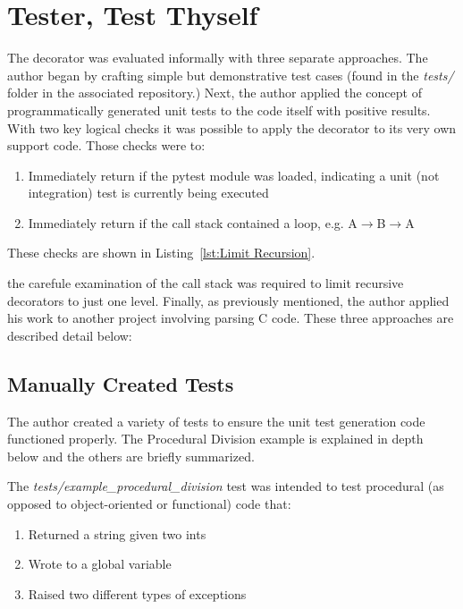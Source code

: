 \section{Tester, Test Thyself}\label{sec:evaluation}

The decorator was evaluated informally with three separate approaches.
The author began by crafting simple but demonstrative test cases 
(found in the \textit{tests/} folder in the associated repository.) Next,
the author applied the concept of programmatically generated unit tests
to the code itself with positive results. With two key logical checks it
was possible to apply the decorator to its very own support code.  Those
checks were to:

\begin{enumerate}
  \item Immediately return if the pytest module was loaded, indicating a unit (not integration) test is currently being executed
  \item Immediately return if the call stack contained a loop, e.g. A$\rightarrow$B$\rightarrow$A
\end{enumerate}

These checks are shown in Listing~\ref{lst:Limit Recursion}.



the carefule examination of the call stack was required to limit 
recursive decorators to just one level. Finally, as previously mentioned, 
the author applied his work to another project involving parsing C code. 
These three approaches are described detail below:

\subsection{Manually Created Tests}\label{sec:eval-1}
The author created a variety of tests to ensure the unit test generation 
code functioned properly. The Procedural Division example is explained in depth
below and the others are briefly summarized.

The \textit{tests/example\_procedural\_division} test was intended 
to test procedural (as opposed to object-oriented or functional) code that:  

\begin{enumerate}
    \item Returned a string given two ints
    \item Wrote to a global variable
    \item Raised two different types of exceptions
\end{enumerate}

